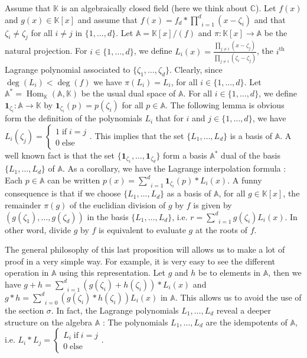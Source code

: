 \documentclass{article}
\newcommand{\tmmathbf}[1]{\ensuremath{\boldsymbol{#1}}}
\newcommand{\tmop}[1]{\ensuremath{\operatorname{#1}}}
\begin{document}
Assume that $\mathbb{K}$ is an algebraically closed field (here we think
about $\mathbb{C}$). Let $f (x)$ and $g (x) \in \mathbb{K}[x]$ and assume
that $f (x) = f_d \ast \underset{i = 1}{\overset{d}{\prod}} (x - \zeta_i)$ and
that $\zeta_i \neq \zeta_j$ for all $i \neq j$ in $\{1, \ldots, d\}$. Let
$\mathbb{A}=\mathbb{K}[x] / (f)$ and $\pi : \mathbb{K}[x] \longrightarrow
\mathbb{A}$ be the natural projection. For $i \in \{1, \ldots, d\}$, we
define $L_i (x) = \frac{\underset{j \neq i}{\prod} (x - \zeta_j)}{\underset{j
\neq i}{\prod} (\zeta_i - \zeta_j)}$, the $i^{\text{th}}$ Lagrange polynomial
associated to $\{\zeta_1, \ldots, \zeta_d \}$. Clearly, since $\deg (L_i) <
\deg (f)$ we have $\pi (L_i) = L_i$, for all $i \in \{1, \ldots, d\}$. Let
$\mathbb{A}^{\ast} = \tmop{Hom}_{\mathbb{K}} (\mathbb{A}, \mathbb{K})$ be
the usual dual space of $\mathbb{A}$. For all $i \in \{1, \ldots, d\}$, we
define $\tmmathbf{1}_{\zeta_i} : \mathbb{A} \longrightarrow \mathbb{K}$ by
$\tmmathbf{1}_{\zeta_i} (p) = p (\zeta_i)$ for all $p \in \mathbb{A}$. The
following lemma is obvious form the definition of the polynomials $L_i$ that
for $i$ and $j \in \{1, \ldots, d\}$, we have $L_i (\zeta_j) = \left\{
\begin{array}{l}
  1 \tmop{if} i = j\\
  0 \tmop{else}
\end{array} \right.$. This implies that the set $\{L_1, \ldots, L_d \}$ is a
basis of $\mathbb{A}$. A well known fact is that the set
$\{\tmmathbf{1}_{\zeta_1}, \ldots, \tmmathbf{1}_{\zeta_d} \}$ form a basis
$\mathbb{A}^{\ast}$ dual of the basis $\{L_1, \ldots, L_d \}$ of
$\mathbb{A}$. As a corollary, we have the Lagrange interpolation formula :
Each $p \in \mathbb{A}$ can be written $p (x) = \underset{i =
1}{\overset{d}{\sum}} \tmmathbf{1}_{\zeta_i} (p) \ast L_i (x)$. A funny
consequence is that if we choose $\{L_1, \ldots, L_d \}$ as a basis of
$\mathbb{A}$, for all $g \in \mathbb{K}[x]$, the remainder $\pi (g)$ of the
euclidian division of $g$ by $f$ is given by $(g (\zeta_1), \ldots, g
(\zeta_d))$ in the basis $\{L_1, \ldots, L_d \}$, i.e. $r = \underset{i =
1}{\overset{d}{\sum}} g (\zeta_i) L_i (x)$. In other word, divide $g$ by $f$
is equivalent to evaluate $g$ at the roots of $f$.

The general philosophy of this last proposition will allows us to make a lot
of proof in a very simple way. For example, it is very easy to see the
different operation in $\mathbb{A}$ using this representation. Let $g$ and
$h$ be to elements in $\mathbb{A}$, then we have $g + h = \underset{i =
1}{\overset{d}{\sum}} (g (\zeta_i) + h (\zeta_i)) \ast L_i (x)$ and $g \ast h
= \underset{i = 0}{\overset{d}{\sum}} (g (\zeta_i) \ast h (\zeta_i)) L_i (x)$
in $\mathbb{A}$. This allows us to avoid the use of the section $\sigma$. In
fact, the Lagrange polynomials $L_1, \ldots, L_d$ reveal a deeper structure on
the algebra $\mathbb{A}$ : The polynomials $L_1, \ldots, L_d$ are the
idempotents of $\mathbb{A}$, i.e. $L_i \ast L_j = \left\{ \begin{array}{l}
  L_i \tmop{if} i = j\\
  0 \tmop{else}
\end{array} \right.$.
\end{document}
